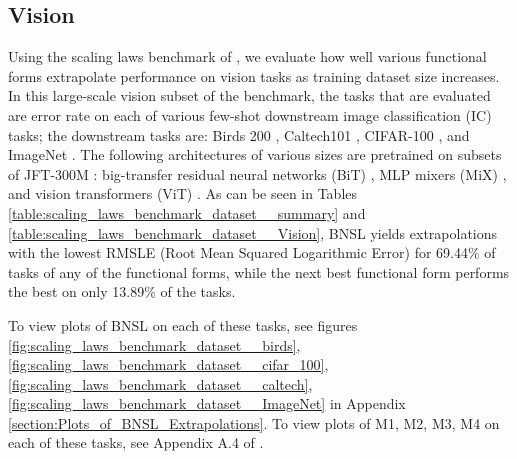 \documentclass{article} %
\begin{document}
\FloatBarrier
\vspace{-3.6mm}
\subsection{Vision}
\vspace{-3.6mm}
\label{section:scaling_benchmark__vision}


Using the scaling laws benchmark of \cite{Alabdulmohsi2022revisiting}, we evaluate how well various functional forms extrapolate performance on vision tasks as training dataset size increases. In this large-scale vision subset of the benchmark, the tasks that are evaluated are error rate on each of various few-shot downstream image classification (IC) tasks; the downstream tasks are: Birds 200 \citep{welinder2010caltech}, Caltech101 \citep{fei2004learning}, CIFAR-100 \citep{krizhevsky2009learning}, and ImageNet \citep{deng2009imagenet}. The following architectures of various sizes are pretrained on subsets of JFT-300M \citep{sun2017revisiting}: big-transfer residual neural networks (BiT) \citep{kolesnikov2020big}, MLP mixers (MiX) \citep{tolstikhin2021mlp}, and vision transformers (ViT) \citep{dosovitskiy2020image}. As can be seen in Tables  \ref{table:scaling_laws_benchmark_dataset__summary} and \ref{table:scaling_laws_benchmark_dataset__Vision}, BNSL yields extrapolations with the lowest RMSLE (Root Mean Squared Logarithmic Error) for 69.44\% of tasks of any of the functional forms, while the next best functional form performs the best on only 13.89\% of the tasks.

\vspace{-1.6mm}

To view plots of BNSL on each of these tasks, see figures
\ref{fig:scaling_laws_benchmark_dataset__birds},
\ref{fig:scaling_laws_benchmark_dataset__cifar_100},
\ref{fig:scaling_laws_benchmark_dataset__caltech},
\ref{fig:scaling_laws_benchmark_dataset__ImageNet} in Appendix \ref{section:Plots_of_BNSL_Extrapolations}. To view plots of M1, M2, M3, M4 on each of these tasks, see Appendix A.4 of \cite{Alabdulmohsi2022revisiting}.
\end{document}

